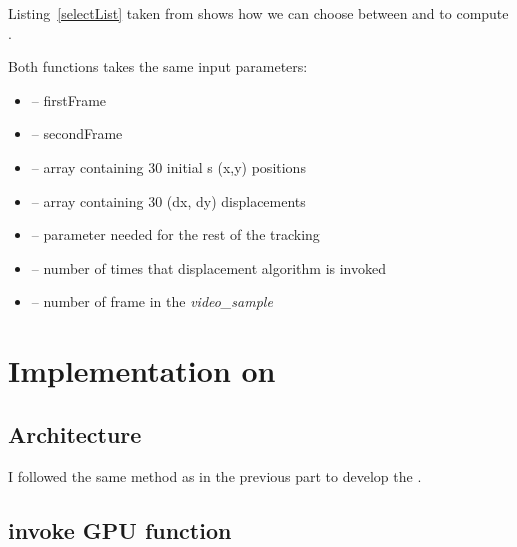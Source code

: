 Listing~\ref{selectList} taken from  shows how we can choose between  and  to compute \flow.

Both functions takes the same input parameters:
\begin{itemize}
	\item {} -- firstFrame
	\item {} -- secondFrame
	\item {} -- array containing 30 initial \feat{}s (x,y) positions
	\item {} -- array containing 30 (dx, dy) displacements
	\item {} -- parameter needed for the rest of the tracking
	\item {} -- number of times that displacement algorithm is invoked
	\item {} -- number of frame in the \emph{video\_sample}
\end{itemize}

\section{Implementation on \vc}

\subsection{Architecture}

I followed the same method as in the previous part to develop the \api.

\subsection{invoke GPU function}
